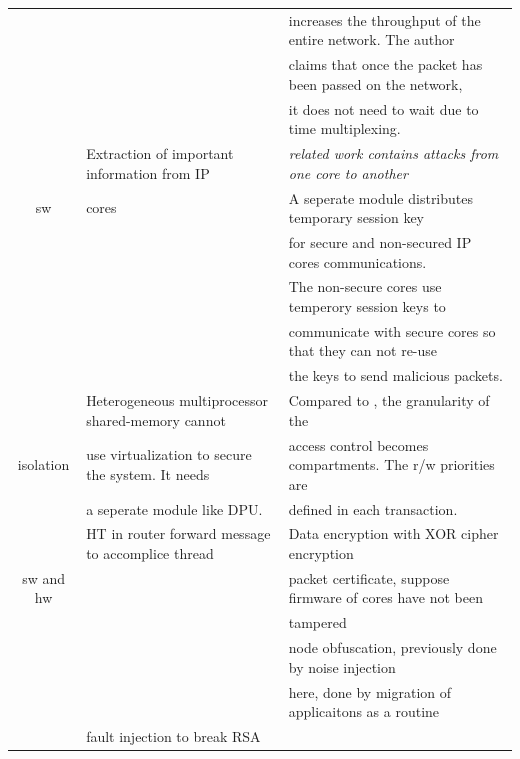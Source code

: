 \documentclass[]{article}
\begin{document}
\begin{table}[!t]
\begin{tabular}{c l l}
							& 													& increases the throughput of the entire network. The author\\
							& 													& claims that once the packet has been passed on the network,\\
							& 													& it does not need to wait due to time multiplexing.\\
	\hline
	\cite{kapoor2013security}& Extraction of important information from IP 		& \textit{related work contains attacks from one core to another}\\
	sw						& cores												& A seperate module distributes temporary session key  \\
							&      												& for secure and non-secured IP cores communications.  \\
							&      												& The non-secure cores use temperory session keys to  \\
							&      												& communicate with secure cores so that they can not re-use  \\
							&													& the keys to send malicious packets.\\
	\hline
	~\cite{porquet2011noc}	& Heterogeneous multiprocessor shared-memory cannot & Compared to \cite{fiorin2008secure}, the granularity of the\\
	isolation				& use virtualization to secure the system. It needs	& access control becomes compartments. The r/w priorities are \\
							& a seperate module like DPU.						& defined in each transaction.\\
	\hline
	~\cite{ancajas2014fort} & HT in router forward message to accomplice thread & Data encryption with XOR cipher encryption \\
	sw and hw				&													& packet certificate, suppose firmware of cores have not been \\
							& 													& tampered\\
							&													& node obfuscation, previously done by noise injection\\
							& 													& here, done by migration of applicaitons as a routine\\
	\hline
	~\cite{pellegrini2010fault} & fault injection to break RSA					&\\

\end{tabular}
\end{table}
\end{document}
